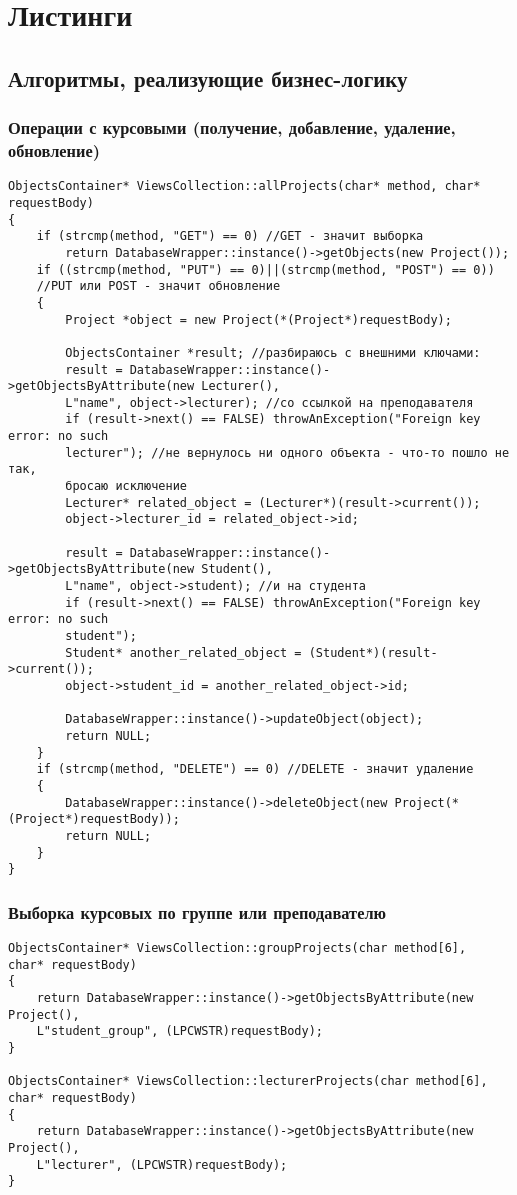 \section{Листинги}

\subsection{Алгоритмы, реализующие бизнес-логику}
\subsubsection{Операции с курсовыми (получение, добавление, удаление, обновление)}
\begin{verbatim}
ObjectsContainer* ViewsCollection::allProjects(char* method, char* requestBody)
{
	if (strcmp(method, "GET") == 0) //GET - значит выборка
		return DatabaseWrapper::instance()->getObjects(new Project());
	if ((strcmp(method, "PUT") == 0)||(strcmp(method, "POST") == 0)) 
	//PUT или POST - значит обновление
	{
		Project *object = new Project(*(Project*)requestBody);

		ObjectsContainer *result; //разбираюсь с внешними ключами:
		result = DatabaseWrapper::instance()->getObjectsByAttribute(new Lecturer(), 
		L"name", object->lecturer); //со ссылкой на преподавателя
		if (result->next() == FALSE) throwAnException("Foreign key error: no such 
		lecturer"); //не вернулось ни одного объекта - что-то пошло не так, 
		бросаю исключение
		Lecturer* related_object = (Lecturer*)(result->current());
		object->lecturer_id = related_object->id;

		result = DatabaseWrapper::instance()->getObjectsByAttribute(new Student(), 
		L"name", object->student); //и на студента
		if (result->next() == FALSE) throwAnException("Foreign key error: no such 
		student");
		Student* another_related_object = (Student*)(result->current());
		object->student_id = another_related_object->id;

		DatabaseWrapper::instance()->updateObject(object);
		return NULL;
	}
	if (strcmp(method, "DELETE") == 0) //DELETE - значит удаление
	{
		DatabaseWrapper::instance()->deleteObject(new Project(*(Project*)requestBody));
		return NULL;
	}
}
\end{verbatim}

\subsubsection{Выборка курсовых по группе или преподавателю}
\begin{verbatim}
ObjectsContainer* ViewsCollection::groupProjects(char method[6], 
char* requestBody)
{
	return DatabaseWrapper::instance()->getObjectsByAttribute(new Project(), 
	L"student_group", (LPCWSTR)requestBody);
}

ObjectsContainer* ViewsCollection::lecturerProjects(char method[6],
char* requestBody)
{
	return DatabaseWrapper::instance()->getObjectsByAttribute(new Project(), 
	L"lecturer", (LPCWSTR)requestBody);
}
\end{verbatim}

